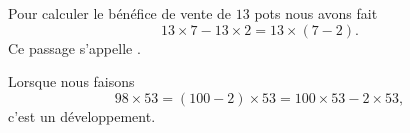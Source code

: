 \begin{example}
    Pour calculer le bénéfice de vente de \( 13\) pots nous avons fait
    \begin{equation}
        13\times 7-13\times 2=13\times (7-2).
    \end{equation}
    Ce passage s'appelle .
\end{example}

\begin{example}
    Lorsque nous faisons
    \begin{equation}
        98\times 53=(100-2)\times 53=100\times 53-2\times 53,
    \end{equation}
    c'est un développement.
\end{example}
